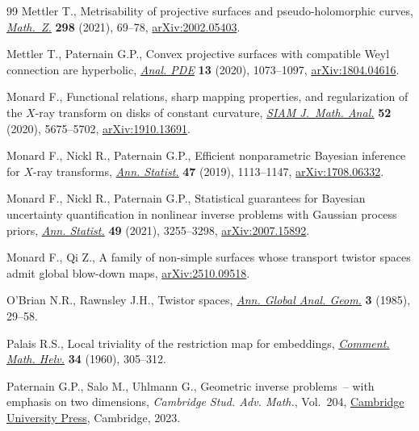 \documentclass[pdftex]{sigma}
\numberwithin{equation}{section}
\theoremstyle{definition}
\newcommand{\1}{{\bf 1}}
\begin{document}
\begin{thebibliography}{99}
Mettler T., Metrisability of projective surfaces and pseudo-holomorphic curves,
 \href{https://doi.org/10.1007/s00209-020-02586-6}{\textit{Math.~Z.}}
 \textbf{298} (2021), 69--78,
 \href{http://arxiv.org/abs/2002.05403}{arXiv:2002.05403}.

Mettler T., Paternain G.P., Convex projective surfaces with compatible {W}eyl
 connection are hyperbolic,
 \href{https://doi.org/10.2140/apde.2020.13.1073}{\textit{Anal. PDE}}
 \textbf{13} (2020), 1073--1097,
 \href{http://arxiv.org/abs/1804.04616}{arXiv:1804.04616}.

Monard F., Functional relations, sharp mapping properties, and regularization
 of the {$X$}-ray transform on disks of constant curvature,
 \href{https://doi.org/10.1137/20M1311508}{\textit{SIAM J.~Math. Anal.}}
 \textbf{52} (2020), 5675--5702,
 \href{http://arxiv.org/abs/1910.13691}{arXiv:1910.13691}.

Monard F., Nickl R., Paternain G.P., Efficient nonparametric {B}ayesian
 inference for {$X$}-ray transforms,
 \href{https://doi.org/10.1214/18-AOS1708}{\textit{Ann. Statist.}} \textbf{47}
 (2019), 1113--1147, \href{http://arxiv.org/abs/1708.06332}{arXiv:1708.06332}.

Monard F., Nickl R., Paternain G.P., Statistical guarantees for {B}ayesian
 uncertainty quantification in nonlinear inverse problems with {G}aussian
 process priors, \href{https://doi.org/10.1214/21-aos2082}{\textit{Ann.
 Statist.}} \textbf{49} (2021), 3255--3298,
 \href{http://arxiv.org/abs/2007.15892}{arXiv:2007.15892}.

Monard F., Qi Z., A family of non-simple surfaces whose transport twistor
 spaces admit global blow-down maps,
 \href{http://arxiv.org/abs/2510.09518}{arXiv:2510.09518}.

O'Brian N.R., Rawnsley J.H., Twistor spaces,
 \href{https://doi.org/10.1007/BF00054490}{\textit{Ann. Global Anal. Geom.}}
 \textbf{3} (1985), 29--58.

Palais R.S., Local triviality of the restriction map for embeddings,
 \href{https://doi.org/10.1007/BF02565942}{\textit{Comment. Math. Helv.}}
 \textbf{34} (1960), 305--312.

Paternain G.P., Salo M., Uhlmann G., Geometric inverse problems~-- with
 emphasis on two dimensions, \textit{Cambridge Stud. Adv. Math.}, Vol.~204,
 \href{https://doi.org/10.1017/9781009039901}{Cambridge University Press},
 Cambridge, 2023.


\end{thebibliography}
\end{document}
